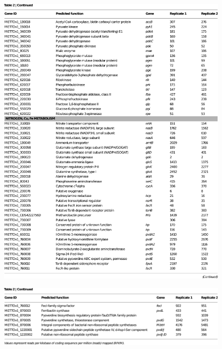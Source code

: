 \begin{figure}[H]
\centering
     \includegraphics[width=1.0\textwidth]{./tex/chapter1/figures/matsen_OB3b_table2_piece3--cropped.pdf}
\end{figure}

\begin{figure}[H]
\centering
     \includegraphics[width=1.0\textwidth]{./tex/chapter1/figures/matsen_OB3b_table2_piece4--cropped.pdf}
\end{figure}


